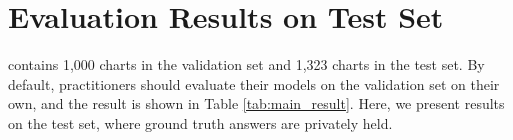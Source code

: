 \newpage
\section{Evaluation Results on Test Set}
\label{sec:eval_on_test_set}

\ours{} contains 1,000 charts in the validation set and 1,323 charts in the test set. By default, practitioners should evaluate their models on the validation set on their own, and the result is shown in Table \ref{tab:main_result}. Here, we present results on the test set, where ground truth answers are privately held.

\begin{table}[h]
  \centering
  \caption{Model evaluation results on test set. \textbf{Bold} number represents the best in-class performance (open-source or proprietary), and \underline{underlined} number represents the second-place. Models with (*) are those whose performance is constrained by input resolutions (see \cref{tab:os_model_components} for details). Info. Extr.$=$information extraction, Enum.$=$enumeration, Patt. Rec.$=$pattern recognition, Cntg.$=$counting, Comp.$=$compositionality. Details for these categories are shown in \cref{fig:overview,,subsec:charxiv_questions}.}
\end{table}
